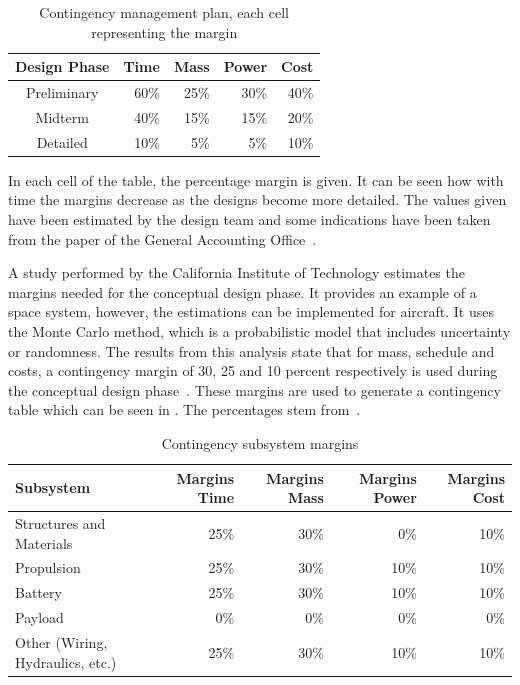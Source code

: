\begin{table}[H]
    \centering
    \caption{Contingency management plan, each cell representing the margin}
    \label{tab:my_label}
    \begin{tabular}{crrrr}
    \hline
        Design Phase & Time & Mass & Power & Cost \\ \hline
        Preliminary & 60\% & 25\% & 30\%  & 40\%\\
        Midterm &40\% & 15\%  & 15\% & 20\%\\
        Detailed & 10\% & 5\% & 5\% & 10\%\\ \hline
    \end{tabular}
\end{table}

In each cell of the table, the percentage margin is given.
It can be seen how with time the margins decrease as the designs become more detailed.
The values given have been estimated by the design team and some indications have been taken from the paper of the General Accounting Office~\cite{contingency}.

A study performed by the California Institute of Technology estimates the margins needed for the conceptual design phase.
It provides an example of a space system, however, the estimations can be implemented for aircraft.
It uses the Monte Carlo method, which is a probabilistic model that includes uncertainty or randomness.
The results from this analysis state that for mass, schedule and costs, a contingency margin of 30, 25 and 10 percent respectively is used during the conceptual design phase~\cite{thunnissen2004method}.
 These margins are used to generate a contingency table which can be seen in .
The percentages stem from~\cite{thunnissen2004method}.


\begin{table}[H]
\centering
\caption{Contingency subsystem margins}
\begin{tabular}{lrrrr}
\hline
\textbf{Subsystem}                & \textbf{Margins Time} & \textbf{Margins Mass} & \textbf{Margins Power} & \textbf{Margins Cost} \\ \hline
Structures and Materials          & 25\%            & 30\%            & 0\%              & 10\%            \\ 
Propulsion                        & 25\%            & 30\%            & 10\%             & 10\%             \\ 
Battery                           & 25\%            & 30\%            & 10\%             & 10\%     \\ 
Payload                           & 0\%             & 0\%            & 0\%               & 0\%             \\ 
Other (Wiring,   Hydraulics, etc.) & 25\%             & 30\%            & 10\%           & 10\%     \\\hline
\end{tabular}
\label{tab:techcontingengcy}
\end{table}


